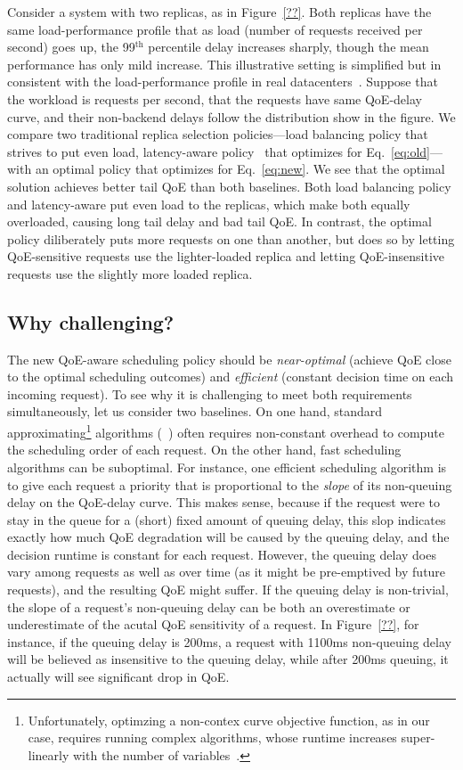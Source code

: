 Consider a system with two replicas, as in Figure~\ref{??}. 
Both replicas have the same load-performance profile that as load (number of requests received per second) goes up, the 99$^\textrm{th}$ percentile delay increases sharply, though the mean performance has only mild increase. 
This illustrative setting is simplified but in consistent with the load-performance profile in real datacenters~\cite{??}.
Suppose that the workload is \fillme requests per second, that the requests have same QoE-delay curve, and their non-backend delays follow the distribution show in the figure.
We compare two traditional replica selection policies---load balancing policy that strives to put even load, latency-aware policy~\cite{c3,cassandra,etc} that optimizes for Eq.~\ref{eq:old}---with an optimal policy that optimizes for Eq.~\ref{eq:new}.
We see that the optimal solution achieves better tail QoE than both baselines. 
Both load balancing policy and latency-aware put even load to the replicas, which make both equally overloaded, causing long tail delay and bad tail QoE.
In contrast, the optimal policy diliberately puts more requests on one than another, but does so by letting QoE-sensitive requests use the lighter-loaded replica and letting QoE-insensitive requests use the slightly more loaded replica. 

\subsection{Why challenging?}
The new QoE-aware scheduling policy should be {\em near-optimal} (\ie achieve QoE close to the optimal scheduling outcomes) and {\em efficient} (\ie constant decision time on each incoming request).
To see why it is challenging to meet both requirements simultaneously, let us consider two baselines.
On one hand, standard approximating\footnote{Unfortunately, optimzing a non-contex curve objective function, as in our case, requires running complex algorithms, whose runtime increases super-linearly with the number of variables~\cite{??}.} algorithms (\eg~\cite{??}) often requires non-constant overhead to compute the scheduling order of each request. 
On the other hand, fast scheduling algorithms can be suboptimal. 
For instance, one efficient scheduling algorithm is to give each request a priority that is proportional to the {\em slope} of its non-queuing delay on the QoE-delay curve. 
This makes sense, because if the request were to stay in the queue for a (short) fixed amount of queuing delay, this slop indicates exactly how much QoE degradation will be caused by the queuing delay, and the decision runtime is constant for each request.
However, the queuing delay does vary among requests as well as over time (as it might be pre-emptived by future requests), and the resulting QoE might suffer.
If the queuing delay is non-trivial, the slope of a request's non-queuing delay can be both an overestimate or underestimate of the acutal QoE sensitivity of a request. 
In Figure~\ref{??}, for instance, if the queuing delay is 200ms, a request with 1100ms non-queuing delay will be believed as insensitive to the queuing delay, while after 200ms queuing, it actually will see significant drop in QoE. 

